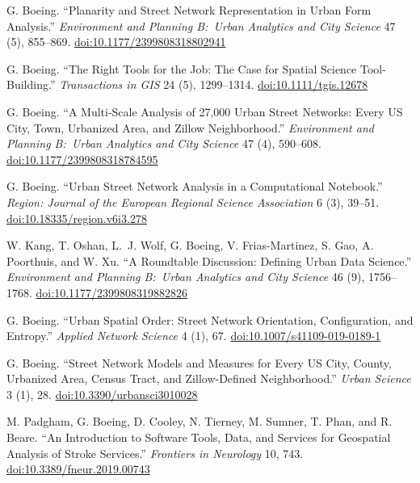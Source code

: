 \documentclass[11pt,a4paper]{report} %
\begin{document}
\begin{tablist}
\item[2020] \tab{}G. Boeing. \enquote{Planarity and Street Network Representation in Urban Form Analysis.} \textit{Environment and Planning B:\ Urban Analytics and City Science} 47 (5), 855--869. \href{https://doi.org/10.1177/2399808318802941}{doi:10.1177/2399808318802941}

\item[2020] \tab{}G. Boeing. \enquote{The Right Tools for the Job: The Case for Spatial Science Tool-Building.} \textit{Transactions in GIS} 24 (5), 1299--1314. \href{https://doi.org/10.1111/tgis.12678}{doi:10.1111/tgis.12678}

\item[2020] \tab{}G. Boeing. \enquote{A Multi-Scale Analysis of 27,000 Urban Street Networks: Every US City, Town, Urbanized Area, and Zillow Neighborhood.} \textit{Environment and Planning B:\ Urban Analytics and City Science} 47 (4), 590--608. \href{https://doi.org/10.1177/2399808318784595}{doi:10.1177/2399808318784595}

\item[2020] \tab{}G. Boeing. \enquote{Urban Street Network Analysis in a Computational Notebook.} \textit{Region: Journal of the European Regional Science Association} 6 (3), 39--51. \href{https://doi.org/10.18335/region.v6i3.278}{doi:10.18335/region.v6i3.278}

\item[2019] \tab{}W. Kang, T. Oshan, L.~J. Wolf, G. Boeing, V. Frias-Martinez, S. Gao, A. Poorthuis, and W. Xu. \enquote{A Roundtable Discussion: Defining Urban Data Science.} \textit{Environment and Planning B:\ Urban Analytics and City Science} 46 (9), 1756--1768. \href{https://doi.org/10.1177/2399808319882826}{doi:10.1177/2399808319882826}

\item[2019] \tab{}G. Boeing. \enquote{Urban Spatial Order: Street Network Orientation, Configuration, and Entropy.} \textit{Applied Network Science} 4 (1), 67. \href{https://doi.org/10.1007/s41109-019-0189-1}{doi:10.1007/s41109-019-0189-1}

\item[2019] \tab{}G. Boeing. \enquote{Street Network Models and Measures for Every US City, County, Urbanized Area, Census Tract, and Zillow-Defined Neighborhood.} \textit{Urban Science} 3 (1), 28. \href{https://doi.org/10.3390/urbansci3010028}{doi:10.3390/urbansci3010028}

\item[2019] \tab{}M. Padgham, G. Boeing, D. Cooley, N. Tierney, M. Sumner, T. Phan, and R. Beare. \enquote{An Introduction to Software Tools, Data, and Services for Geospatial Analysis of Stroke Services.} \textit{Frontiers in Neurology} 10, 743. \href{https://doi.org/10.3389/fneur.2019.00743}{doi:10.3389/fneur.2019.00743}


\end{tablist}
\end{document}
